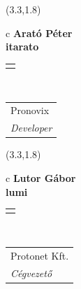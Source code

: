 \documentclass[11pt]{article}
\begin{document}
\makebox(3.3,1.8){
  \renewcommand\arraystretch{1.3}
  \begin{tabular}[c]{c}
    \hspace{8.5mm}
    \LARGE\bf{ Arató Péter }\\
    \hspace{8.5mm}
    \Large{ itarato }\\
    \renewcommand\arraystretch{3}
    \begin{tabular}[c]{c}
      \centering
      \fontfamily{phv}\selectfont{
        \textbf{
          \textsc{
            \scriptsize{
            \color{Dark}{ Ismerkedő }\color{Dark}{ Webmester }\color{Dark}{ Sminkmester }\color{Dark}{ Programozó }
            }
          }
        }
      }
    \end{tabular}
    \\
    \renewcommand\arraystretch{1}
    \begin{tabular}{p{3.3in}}
      \hspace{.7cm}Pronovix\\
      \hspace{.7cm}\emph{ Developer }\\
    \end{tabular}
  \end{tabular}
}

\makebox(3.3,1.8){
  \renewcommand\arraystretch{1.3}
  \begin{tabular}[c]{c}
    \hspace{8.5mm}
    \LARGE\bf{ Lutor Gábor }\\
    \hspace{8.5mm}
    \Large{ lumi }\\
    \renewcommand\arraystretch{3}
    \begin{tabular}[c]{c}
      \centering
      \fontfamily{phv}\selectfont{
        \textbf{
          \textsc{
            \scriptsize{
            \color{Bright}{ Ismerkedő }\color{Dark}{ Webmester }\color{Bright}{ Sminkmester }\color{Bright}{ Programozó }
            }
          }
        }
      }
    \end{tabular}
    \\
    \renewcommand\arraystretch{1}
    \begin{tabular}{p{3.3in}}
      \hspace{.7cm}Protonet Kft.\\
      \hspace{.7cm}\emph{ Cégvezető }\\
    \end{tabular}
  \end{tabular}
}
\end{document}
